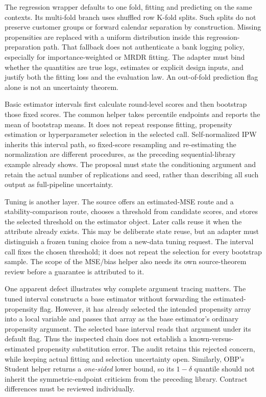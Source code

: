 The regression wrapper defaults to one fold, fitting and predicting on the
same contexts. Its multi-fold branch uses shuffled row K-fold splits. Such
splits do not preserve customer groups or forward calendar separation by
construction. Missing propensities are replaced with a uniform distribution
inside this regression-preparation path. That fallback does not authenticate a
bank logging policy, especially for importance-weighted or MRDR fitting. The
adapter must bind whether the quantities are true logs, estimates or explicit
design inputs, and justify both the fitting loss and the evaluation law. An
out-of-fold prediction flag alone is not an uncertainty theorem.
\citep{exec23_obp_sources}

Basic estimator intervals first calculate round-level scores and then bootstrap
those fixed scores. The common helper takes percentile endpoints and reports
the mean of bootstrap means. It does not repeat response fitting, propensity
estimation or hyperparameter selection in the selected call. Self-normalized
IPW inherits this interval path, so fixed-score resampling and re-estimating the
normalization are different procedures, as the preceding sequential-library
example already shows. The proposal must state the conditioning argument and
retain the actual number of replications and seed, rather than describing all
such output as full-pipeline uncertainty.
\citep{exec23_obp_sources}

Tuning is another layer. The source offers an estimated-MSE route and a
stability-comparison route, chooses a threshold from candidate scores, and
stores the selected threshold on the estimator object. Later calls reuse it
when the attribute already exists. This may be deliberate state reuse, but an
adapter must distinguish a frozen tuning choice from a new-data tuning request.
The interval call fixes the chosen threshold; it does not repeat the selection
for every bootstrap sample. The scope of the MSE/bias helper also needs its own
source-theorem review before a guarantee is attributed to it.
\citep{exec23_obp_sources}

One apparent defect illustrates why complete argument tracing matters. The
tuned interval constructs a base estimator without forwarding the estimated-
propensity flag. However, it has already selected the intended propensity
array into a local variable and passes that array as the base estimator's
ordinary propensity argument. The selected base interval reads that argument
under its default flag. Thus the inspected chain does not establish a
known-versus-estimated propensity substitution error. The audit retains this
rejected concern, while keeping actual fitting and selection uncertainty open.
Similarly, OBP's Student helper returns a \emph{one-sided} lower bound, so its
$1-\delta$ quantile should not inherit the symmetric-endpoint criticism from
the preceding library. Contract differences must be reviewed individually.
\citep{exec23_obp_sources,exec23_obp_reference}

